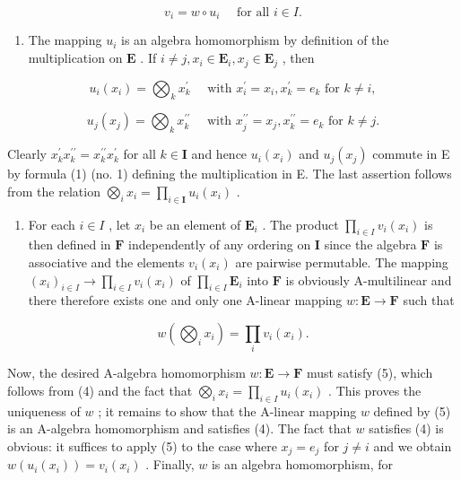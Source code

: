 \[
v _ {i} = w \circ u _ {i} \quad \text { for all } i \in I.\tag{4}
\]

\begin{enumerate}
\def\labelenumi{(\roman{enumi})}
\tightlist
\item
  The mapping \(u_{i}\) is an algebra homomorphism by definition of the multiplication on \(\mathbf{E}\) . If \(i \neq j, x_{i} \in \mathbf{E}_{i}, x_{j} \in \mathbf{E}_{j}\) , then
\end{enumerate}

\[
u _ {i} (x _ {i}) = \bigotimes_ {k} x _ {k} ^ {\prime} \quad \text { with } x _ {i} ^ {\prime} = x _ {i}, x _ {k} ^ {\prime} = e _ {k} \text { for } k \neq i,
\]

\[
u _ {j} (x _ {j}) = \bigotimes_ {k} x _ {k} ^ {\prime \prime} \quad \text { with } x _ {j} ^ {\prime \prime} = x _ {j}, x _ {k} ^ {\prime \prime} = e _ {k} \text { for } k \neq j.
\]

Clearly \(x_{k}^{\prime}x_{k}^{\prime \prime} = x_{k}^{\prime \prime}x_{k}^{\prime}\) for all \(k\in \mathbf{I}\) and hence \(u_{i}(x_{i})\) and \(u_{j}(x_{j})\) commute in E by formula (1) (no. 1) defining the multiplication in E. The last assertion follows from the relation \(\bigotimes_{i}x_{i} = \prod_{i\in \mathbf{I}}u_{i}(x_{i})\) .

\begin{enumerate}
\def\labelenumi{(\roman{enumi})}
\setcounter{enumi}{1}
\tightlist
\item
  For each \(i \in I\) , let \(x_{i}\) be an element of \(\mathbf{E}_{i}\) . The product \(\prod_{i \in I} v_{i}(x_{i})\) is then defined in \(\mathbf{F}\) independently of any ordering on \(\mathbf{I}\) since the algebra \(\mathbf{F}\) is associative and the elements \(v_{i}(x_{i})\) are pairwise permutable. The mapping \((x_{i})_{i \in I} \to \prod_{i \in I} v_{i}(x_{i})\) of \(\prod_{i \in I} \mathbf{E}_{i}\) into \(\mathbf{F}\) is obviously A-multilinear and there therefore exists one and only one A-linear mapping \(w: \mathbf{E} \to \mathbf{F}\) such that
\end{enumerate}

\[
w \left(\bigotimes_ {i} x _ {i}\right) = \prod_ {i} v _ {i} \left(x _ {i}\right).\tag{5}
\]

Now, the desired A-algebra homomorphism \(w: \mathbf{E} \to \mathbf{F}\) must satisfy (5), which follows from (4) and the fact that \(\bigotimes_{i} x_i = \prod_{i \in I} u_i(x_i)\) . This proves the uniqueness of \(w\) ; it remains to show that the A-linear mapping \(w\) defined by (5) is an A-algebra homomorphism and satisfies (4). The fact that \(w\) satisfies (4) is obvious: it suffices to apply (5) to the case where \(x_j = e_j\) for \(j \neq i\) and we obtain \(w(u_i(x_i)) = v_i(x_i)\) . Finally, \(w\) is an algebra homomorphism, for

